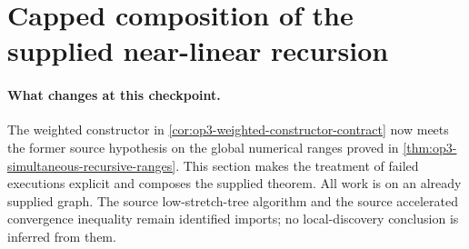 \section{Capped composition of the supplied near-linear recursion}
\label{sec:op3-complete-supplied-recursion}

\paragraph{What changes at this checkpoint.}
The weighted constructor in \cref{cor:op3-weighted-constructor-contract}
now meets the former source hypothesis on the global numerical ranges
proved in \cref{thm:op3-simultaneous-recursive-ranges}. This section
makes the treatment of failed executions explicit and composes the
supplied theorem. All work is on an already supplied graph. The source
low-stretch-tree algorithm and the source accelerated convergence
inequality remain identified imports; no local-discovery conclusion is
inferred from them.

